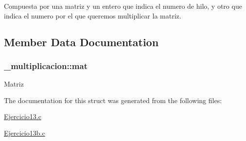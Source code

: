 Compuesta por una matriz y un entero que indica el numero de hilo, y otro que indica el numero por el que queremos multiplicar la matriz. 

\subsection{Member Data Documentation}
\subsubsection[{\texorpdfstring{mat}{mat}}]{ \+\_\+multiplicacion\+::mat}\hypertarget{struct__multiplicacion_abfec5d50833a74d0dcc94c685256055f}{}\label{struct__multiplicacion_abfec5d50833a74d0dcc94c685256055f}
Matriz 

The documentation for this struct was generated from the following files\+:\begin{DoxyCompactItemize}
\item 
\hyperlink{Ejercicio13_8c}{Ejercicio13.\+c}\item 
\hyperlink{Ejercicio13b_8c}{Ejercicio13b.\+c}\end{DoxyCompactItemize}

